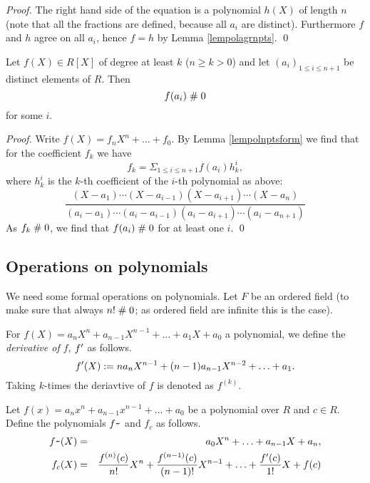 \begin{proof}
The right hand side of the equation is a polynomial $h(X)$ of length
$n$ (note that all the fractions are defined, because all $a_i$ are
distinct). Furthermore $f$ and $h$ agree on all $a_i$, hence $f=h$ by
Lemma \ref{lempolagrnpts}. \qed
\end{proof}

\begin{lemma}\label{lempolnpts}
Let $f(X) \in R[X]$ of degree at least $k$ ($n\geq k > 0$) and let
$(a_i)_{1\leq i \leq 
n+1}$ be distinct elements of $R$. Then 
$$f(a_i) \mathrel{\#} 0$$
for some $i$.
\end{lemma}

\begin{proof}
Write $f(X) = f_n X^n + \ldots + f_0$.  By Lemma \ref{lempolnptsform}
we find that for the coefficient $f_k$ we
have
$$f_k = \Sigma_{1\leq i \leq n+1} f(a_i) h_k^i,$$
where $h_k^i$ is the $k$-th coefficient of the $i$-th polynomial as above:
$$\frac{(X-a_1) \cdots
  (X-a_{i-1})(X-a_{i+1})\cdots(X-a_{n})}{(a_{i}-a_1)\cdots (a_{i}
  -a_{i-1})(a_{i} -a_{i+1}) \cdots (a_{i}-a_{n+1})}$$
As $f_k \mathrel{\#} 0$, we find that $f(a_i) \mathrel{\#} 0$ for at least one
$i$. \qed
\end{proof}


\subsection{Operations on polynomials}

We need some formal operations on polynomials. Let $F$ be an ordered
field (to make sure that always $n!\mathrel{\#} 0$; as ordered
field are infinite this is the case).


\begin{definition}
  For $f(X) = a_n X^n+a_{n-1}X^{n-1}+\ldots +a_1 X +a_0$ a polynomial,
  we define the {\em derivative of $f$}, $f^{\prime}$ as follows.
$$f^{\prime} (X) := na_n X^{n-1}+(n-1)a_{n-1}X^{n-2}+\ldots +a_1.$$
Taking $k$-times the deriavtive of $f$ is denoted as $f^{(k)}$.
\end{definition}

\begin{definition}\label{defpolyop} Let
  $f(x)=a_nx^n+a_{n-1}x^{n-1}+\ldots +a_0$ be a polynomial over
  $R$ and $c\in R$. Define the polynomials $f{{\verb+~+}}$ and $f_c$ as
  follows.
  \begin{eqnarray*}
    f{{\verb+~+}}(X)&=&a_0 X^n+\ldots +a_{n-1}X+a_n,\\
    f_c(X)&=&\frac{f^{(n)}(c)}{n!}X^n+\frac{f^{(n-1)}(c)}{(n-1)!}X^{n-1}+ 
    \ldots +\frac{f\ac(c)}{1!}X + f(c)  
  \end{eqnarray*}
\end{definition}

